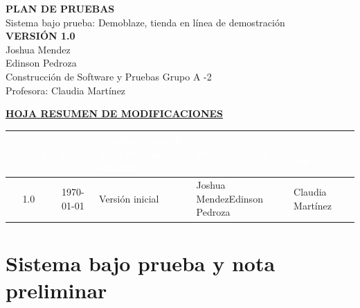 \documentclass[11pt,a4paper]{article}
\begin{document}
\thispagestyle{plantilla}

\vspace*{5.5cm}
\begin{center}
{\fontsize{26}{30}\selectfont\bfseries PLAN DE PRUEBAS}\\[0.5cm]
{\large Sistema bajo prueba: Demoblaze, tienda en línea de demostración}\\[1.6cm]
{\large\bfseries VERSIÓN 1.0}\\[2.5cm]
{\normalsize Joshua Mendez}\\[0.15cm]
{\normalsize Edinson Pedroza}\\[0.25cm]
{\normalsize Construcción de Software y Pruebas \quad Grupo A -2}\\[0.25cm]
{\normalsize Profesora: Claudia Martínez}
\end{center}
\clearpage

\vspace*{0.8cm}
\begin{center}\underline{\textbf{\large HOJA RESUMEN DE MODIFICACIONES}}\end{center}
\vspace{0.6cm}
{\small
\renewcommand{\arraystretch}{1.5}
\noindent\begin{tabularx}{\textwidth}{|c|c|Y|L{2.7cm}|L{2.7cm}|}
\hline
{}
\textcolor{white}{\textbf{Versión}} & \textcolor{white}{\textbf{Fecha}} & \textcolor{white}{\textbf{Cambios respecto de la versión anterior}} & \textcolor{white}{\textbf{Preparado por}} & \textcolor{white}{\textbf{Aprobado por}}\\
 & \today & Versión inicial & Joshua Mendez\newline Edinson Pedroza & Claudia Martínez\\
\hline
\end{tabularx}}
\clearpage

\renewcommand{\contentsname}{ÍNDICE}
\renewcommand{\cfttoctitlefont}{\hfill\large\bfseries}
\renewcommand{\cftaftertoctitle}{\hfill}
\tableofcontents
\clearpage



\FloatBarrier
\section*{Sistema bajo prueba y nota preliminar}
\end{document}
